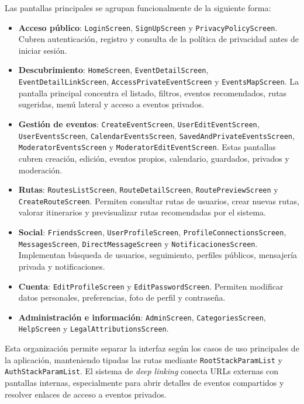 Las pantallas principales se agrupan funcionalmente de la siguiente forma:

\begin{itemize}
    \item \textbf{Acceso público}: \texttt{LoginScreen}, \texttt{SignUpScreen} y \texttt{PrivacyPolicyScreen}. Cubren autenticación, registro y consulta de la política de privacidad antes de iniciar sesión.
    \item \textbf{Descubrimiento}: \texttt{HomeScreen}, \texttt{EventDetailScreen}, \texttt{EventDetailLinkScreen}, \texttt{AccessPrivateEventScreen} y \texttt{EventsMapScreen}. La pantalla principal concentra el listado, filtros, eventos recomendados, rutas sugeridas, menú lateral y acceso a eventos privados.
    \item \textbf{Gestión de eventos}: \texttt{CreateEventScreen}, \texttt{UserEditEventScreen}, \texttt{UserEventsScreen}, \texttt{CalendarEventsScreen}, \texttt{SavedAndPrivateEventsScreen}, \texttt{ModeratorEventsScreen} y \texttt{ModeratorEditEventScreen}. Estas pantallas cubren creación, edición, eventos propios, calendario, guardados, privados y moderación.
    \item \textbf{Rutas}: \texttt{RoutesListScreen}, \texttt{RouteDetailScreen}, \texttt{RoutePreviewScreen} y \texttt{CreateRouteScreen}. Permiten consultar rutas de usuarios, crear nuevas rutas, valorar itinerarios y previsualizar rutas recomendadas por el sistema.
    \item \textbf{Social}: \texttt{FriendsScreen}, \texttt{UserProfileScreen}, \texttt{ProfileConnectionsScreen}, \texttt{MessagesScreen}, \texttt{DirectMessageScreen} y \texttt{NotificacionesScreen}. Implementan búsqueda de usuarios, seguimiento, perfiles públicos, mensajería privada y notificaciones.
    \item \textbf{Cuenta}: \texttt{EditProfileScreen} y \texttt{EditPasswordScreen}. Permiten modificar datos personales, preferencias, foto de perfil y contraseña.
    \item \textbf{Administración e información}: \texttt{AdminScreen}, \texttt{CategoriesScreen}, \texttt{HelpScreen} y \texttt{LegalAttributionsScreen}.
\end{itemize}

Esta organización permite separar la interfaz según los casos de uso principales de la aplicación, manteniendo tipadas las rutas mediante \texttt{RootStackParamList} y \texttt{AuthStackParamList}. El sistema de \textit{deep linking} conecta URLs externas con pantallas internas, especialmente para abrir detalles de eventos compartidos y resolver enlaces de acceso a eventos privados.

